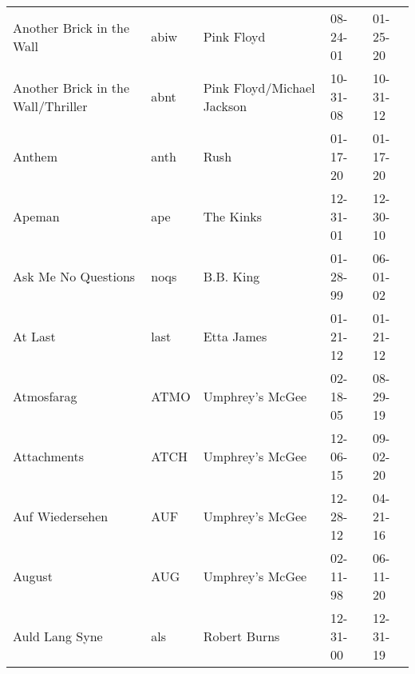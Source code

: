 \begin{longtable}{p{}p{}p{}p{}p{}}
                                               Another Brick in the Wall &          abiw &                                               Pink Floyd &              08-24-01 &             01-25-20 \\
                                      Another Brick in the Wall/Thriller &          abnt &                               Pink Floyd/Michael Jackson &              10-31-08 &             10-31-12 \\
                                                                  Anthem &          anth &                                                     Rush &              01-17-20 &             01-17-20 \\
                                                                  Apeman &           ape &                                                The Kinks &              12-31-01 &             12-30-10 \\
                                                     Ask Me No Questions &          noqs &                                                B.B. King &              01-28-99 &             06-01-02 \\
                                                                 At Last &          last &                                               Etta James &              01-21-12 &             01-21-12 \\
                                                              Atmosfarag &          ATMO &                                          Umphrey's McGee &              02-18-05 &             08-29-19 \\
                                                             Attachments &          ATCH &                                          Umphrey's McGee &              12-06-15 &             09-02-20 \\
                                                         Auf Wiedersehen &           AUF &                                          Umphrey's McGee &              12-28-12 &             04-21-16 \\
                                                                  August &           AUG &                                          Umphrey's McGee &              02-11-98 &             06-11-20 \\
                                                          Auld Lang Syne &           als &                                             Robert Burns &              12-31-00 &             12-31-19 \\

\end{longtable}
